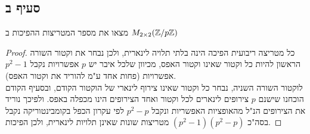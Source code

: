 \documentclass{article}
\begin{document}
		\subsection*{סעיף ב}
		מצאו את מספר המטריצות ההפיכות ב $M_{2\times 2}(\mathbb{Z} / p\mathbb{Z})$
		\begin{proof}
			כל מטריצה ריבועית הפיכה הינה בלתי תלויה לינארית, ולכן נבחר את וקטור השורה הראשון להיות כל וקטור שאינו וקטור האפס, מכיוון שלכל איבר יש $p$ אפשרויות נקבל $p^2-1$ אפשרויות (פחות אחד ע"מ להוריד את וקטור האפס). \\
			לוקטור השורה השניה, נבחר כל וקטור שאינו צירוף לינארי של הוקטור הקודם, ובסעיף הקודם הוכחנו שישנם $p$ צירופים לינארים לכל וקטור ואחד הצירופים הינו מכפלה באפס. ולפיכך נוריד את הצירופים הנ"ל מהאופציות האפשריות ונקבל $p^2-p$
			לפי עקרון הכפל בקומבינטוריקה נקבל בסה"כ $(p^2-1)(p^2-p)$ מטריצות שונות שאינן תלויות לינארית, ולכן הפיכות.
		\end{proof}

		\pagebreak
\end{document}
